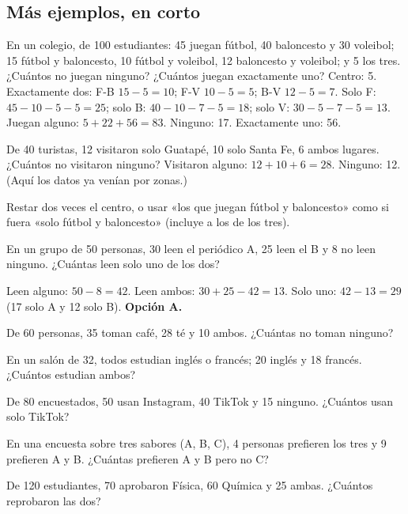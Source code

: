 \subsection{Más ejemplos, en corto}
\begin{ejemplo}
En un colegio, de 100 estudiantes: 45 juegan fútbol, 40 baloncesto y 30 voleibol; 15 fútbol y baloncesto, 10 fútbol y
voleibol, 12 baloncesto y voleibol; y 5 los tres. ¿Cuántos no juegan ninguno? ¿Cuántos juegan exactamente uno?
\solucion Centro: 5. Exactamente dos: F-B $15 - 5 = 10$; F-V $10 - 5 = 5$; B-V $12 - 5 = 7$. Solo F: $45 - 10 - 5 - 5 =
25$; solo B: $40 - 10 - 7 - 5 = 18$; solo V: $30 - 5 - 7 - 5 = 13$. Juegan alguno: $5 + 22 + 56 = 83$. Ninguno: 17.
Exactamente uno: 56.
\end{ejemplo}

\begin{ejemplo}
De 40 turistas, 12 visitaron solo Guatapé, 10 solo Santa Fe, 6 ambos lugares. ¿Cuántos no visitaron ninguno?
\solucion Visitaron alguno: $12 + 10 + 6 = 28$. Ninguno: 12. (Aquí los datos ya venían por zonas.)
\end{ejemplo}

\begin{trampa}
Restar dos veces el centro, o usar «los que juegan fútbol y baloncesto» como si fuera «solo fútbol y baloncesto»
(incluye a los de los tres).
\end{trampa}

\begin{reto}
En un grupo de 50 personas, 30 leen el periódico A, 25 leen el B y 8 no leen ninguno. ¿Cuántas leen solo uno de los dos?
\end{reto}

\begin{retoresuelto}
Leen alguno: $50 - 8 = 42$. Leen ambos: $30 + 25 - 42 = 13$. Solo uno: $42 - 13 = 29$ (17 solo A y 12 solo B).
\textbf{Opción A.}
\end{retoresuelto}

\taller
{}
\begin{ejercicios}
\item De 60 personas, 35 toman café, 28 té y 10 ambos. ¿Cuántas no toman ninguno? 
\item En un salón de 32, todos estudian inglés o francés; 20 inglés y 18 francés. ¿Cuántos estudian ambos? 
\item De 80 encuestados, 50 usan Instagram, 40 TikTok y 15 ninguno. ¿Cuántos usan solo TikTok? 
\end{ejercicios}
\begin{ejercicios}
\item En una encuesta sobre tres sabores (A, B, C), 4 personas prefieren los tres y 9 prefieren A y B. ¿Cuántas prefieren A y B pero no C?
\item De 120 estudiantes, 70 aprobaron Física, 60 Química y 25 ambas. ¿Cuántos reprobaron las dos?
\end{ejercicios}


